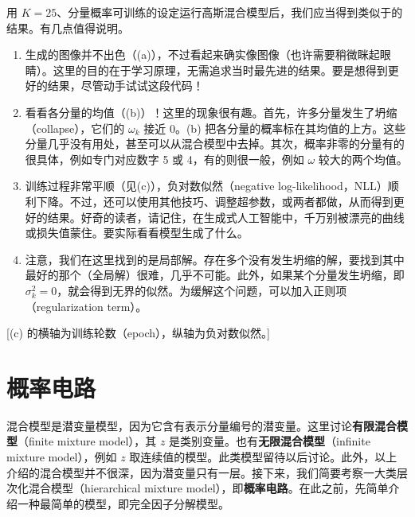 
用 $K=25$、分量概率可训练的设定运行高斯混合模型后，我们应当得到类似于的结果。有几点值得说明。

\begin{enumerate}
\item 生成的图像并不出色（(a)），不过看起来确实像图像（也许需要稍微眯起眼睛）。这里的目的在于学习原理，无需追求当时最先进的结果。要是想得到更好的结果，尽管动手试试这段代码！
\item 看看各分量的均值（(b)）！这里的现象很有趣。首先，许多分量发生了坍缩（collapse），它们的 $\omega_k$ 接近 0。(b) 把各分量的概率标在其均值的上方。这些分量几乎没有用处，甚至可以从混合模型中去掉。其次，概率非零的分量有的很具体，例如专门对应数字 5 或 4，有的则很一般，例如 $\omega$ 较大的两个均值。
\item 训练过程非常平顺（见(c)），负对数似然（negative log-likelihood，NLL）顺利下降。不过，还可以使用其他技巧、调整超参数，或两者都做，从而得到更好的结果。好奇的读者，请记住，在生成式人工智能中，千万别被漂亮的曲线或损失值蒙住。要实际看看模型生成了什么。
\item 注意，我们在这里找到的是局部解。存在多个没有发生坍缩的解，要找到其中最好的那个（全局解）很难，几乎不可能。此外，如果某个分量发生坍缩，即 $\sigma_k^2=0$，就会得到无界的似然。为缓解这个问题，可以加入正则项（regularization term）。
\end{enumerate}

[(c) 的横轴为训练轮数（epoch），纵轴为负对数似然。]

\section{概率电路}
混合模型是潜变量模型，因为它含有表示分量编号的潜变量。这里讨论\textbf{有限混合模型}（finite mixture model），其 $z$ 是类别变量。也有\textbf{无限混合模型}（infinite mixture model），例如 $z$ 取连续值的模型。此类模型留待以后讨论。此外，以上介绍的混合模型并不很深，因为潜变量只有一层。接下来，我们简要考察一大类层次化混合模型（hierarchical mixture model），即\textbf{概率电路}。在此之前，先简单介绍一种最简单的模型，即完全因子分解模型。

